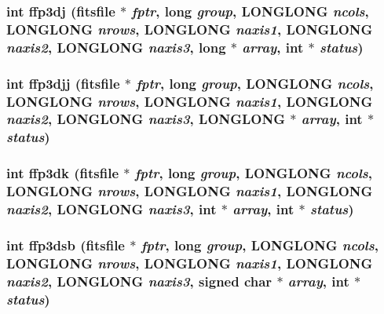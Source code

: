 \subsubsection{\setlength{\rightskip}{0pt plus 5cm}int ffp3dj (\bf{fitsfile} $\ast$ {\em fptr}, long {\em group}, \bf{LONGLONG} {\em ncols}, \bf{LONGLONG} {\em nrows}, \bf{LONGLONG} {\em naxis1}, \bf{LONGLONG} {\em naxis2}, \bf{LONGLONG} {\em naxis3}, long $\ast$ {\em array}, int $\ast$ {\em status})}\label{test_2roimasker_2fitsio_8h_282e156fee640697324c7fcb6c5f1edf}


\subsubsection{\setlength{\rightskip}{0pt plus 5cm}int ffp3djj (\bf{fitsfile} $\ast$ {\em fptr}, long {\em group}, \bf{LONGLONG} {\em ncols}, \bf{LONGLONG} {\em nrows}, \bf{LONGLONG} {\em naxis1}, \bf{LONGLONG} {\em naxis2}, \bf{LONGLONG} {\em naxis3}, \bf{LONGLONG} $\ast$ {\em array}, int $\ast$ {\em status})}\label{test_2roimasker_2fitsio_8h_4b7964ba335cd471910d79a4055aeb1d}


\subsubsection{\setlength{\rightskip}{0pt plus 5cm}int ffp3dk (\bf{fitsfile} $\ast$ {\em fptr}, long {\em group}, \bf{LONGLONG} {\em ncols}, \bf{LONGLONG} {\em nrows}, \bf{LONGLONG} {\em naxis1}, \bf{LONGLONG} {\em naxis2}, \bf{LONGLONG} {\em naxis3}, int $\ast$ {\em array}, int $\ast$ {\em status})}\label{test_2roimasker_2fitsio_8h_e695cca6e553d21f86ee71051783c338}


\subsubsection{\setlength{\rightskip}{0pt plus 5cm}int ffp3dsb (\bf{fitsfile} $\ast$ {\em fptr}, long {\em group}, \bf{LONGLONG} {\em ncols}, \bf{LONGLONG} {\em nrows}, \bf{LONGLONG} {\em naxis1}, \bf{LONGLONG} {\em naxis2}, \bf{LONGLONG} {\em naxis3}, signed char $\ast$ {\em array}, int $\ast$ {\em status})}\label{test_2roimasker_2fitsio_8h_0f9d96f6b290622b85f3dca6c11ea791}


